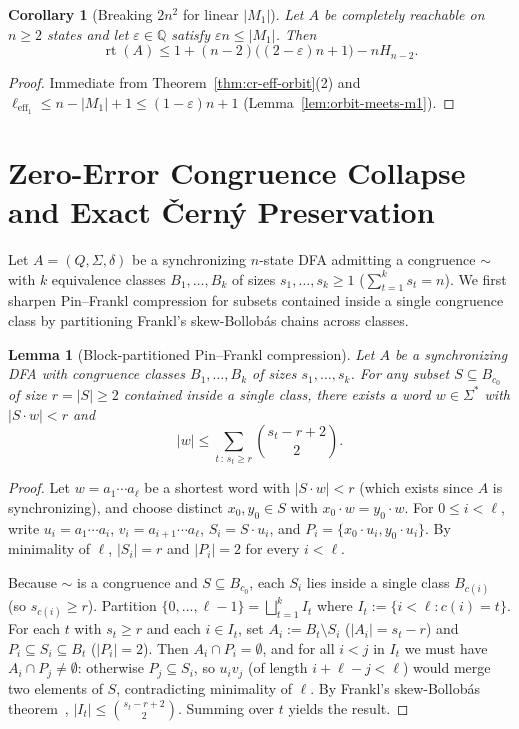 \documentclass[11pt,a4paper]{article}
\newtheorem{lemma}[theorem]{Lemma}
\newtheorem{corollary}[theorem]{Corollary}
\theoremstyle{definition}
\theoremstyle{remark}
\newcommand{\rt}{\operatorname{rt}}
\newcommand{\leff}{\ell_{\mathrm{eff}_1}}
\begin{document}
\begin{corollary}[Breaking $2n^2$ for linear $|M_1|$]\label{cor:cr-breaks-2n2}
Let $A$ be completely reachable on $n \ge 2$ states and let $\varepsilon \in \mathbb{Q}$ satisfy $\varepsilon n \le |M_1|$. Then
\[
  \rt(A) \le 1 + (n - 2)\bigl((2 - \varepsilon)n + 1\bigr) - n H_{n - 2}.
\]
\end{corollary}

\begin{proof}
Immediate from Theorem~\ref{thm:cr-eff-orbit}(2) and $\leff \le n - |M_1| + 1 \le (1 - \varepsilon)n + 1$ (Lemma~\ref{lem:orbit-meets-m1}).
\end{proof}

\section{Zero-Error Congruence Collapse and Exact \v{C}ern\'y Preservation}\label{sec:congruence}

Let $A = (Q, \Sigma, \delta)$ be a synchronizing $n$-state DFA admitting a congruence $\sim$ with $k$ equivalence classes $B_1, \dots, B_k$ of sizes $s_1, \dots, s_k \ge 1$ ($\sum_{t=1}^k s_t = n$). We first sharpen Pin--Frankl compression for subsets contained inside a single congruence class by partitioning Frankl's skew-Bollob\'as chains across classes.

\begin{lemma}[Block-partitioned Pin--Frankl compression]\label{lem:block-pf}
Let $A$ be a synchronizing DFA with congruence classes $B_1, \dots, B_k$ of sizes $s_1, \dots, s_k$. For any subset $S \subseteq B_{c_0}$ of size $r = |S| \ge 2$ contained inside a single class, there exists a word $w \in \Sigma^*$ with $|S \cdot w| < r$ and
\[
  |w| \le \sum_{t \,:\, s_t \ge r} \binom{s_t - r + 2}{2}.
\]
\end{lemma}

\begin{proof}
Let $w = a_1 \cdots a_\ell$ be a shortest word with $|S \cdot w| < r$ (which exists since $A$ is synchronizing), and choose distinct $x_0, y_0 \in S$ with $x_0 \cdot w = y_0 \cdot w$. For $0 \le i < \ell$, write $u_i = a_1 \cdots a_i$, $v_i = a_{i+1} \cdots a_\ell$, $S_i = S \cdot u_i$, and $P_i = \{x_0 \cdot u_i, y_0 \cdot u_i\}$. By minimality of $\ell$, $|S_i| = r$ and $|P_i| = 2$ for every $i < \ell$.

Because $\sim$ is a congruence and $S \subseteq B_{c_0}$, each $S_i$ lies inside a single class $B_{c(i)}$ (so $s_{c(i)} \ge r$). Partition $\{0, \dots, \ell - 1\} = \bigsqcup_{t=1}^k I_t$ where $I_t := \{i < \ell : c(i) = t\}$. For each $t$ with $s_t \ge r$ and each $i \in I_t$, set $A_i := B_t \setminus S_i$ ($|A_i| = s_t - r$) and $P_i \subseteq S_i \subseteq B_t$ ($|P_i| = 2$). Then $A_i \cap P_i = \emptyset$, and for all $i < j$ in $I_t$ we must have $A_i \cap P_j \neq \emptyset$: otherwise $P_j \subseteq S_i$, so $u_i v_j$ (of length $i + \ell - j < \ell$) would merge two elements of $S$, contradicting minimality of $\ell$. By Frankl's skew-Bollob\'as theorem~\cite{Frankl1982}, $|I_t| \le \binom{s_t - r + 2}{2}$. Summing over $t$ yields the result.
\end{proof}
\end{document}
